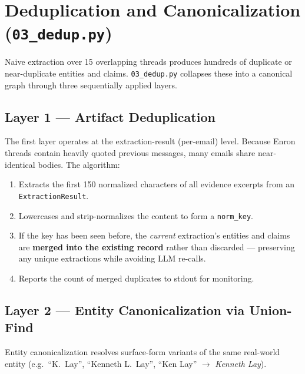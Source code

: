 \documentclass[12pt,a4paper]{article}
\begin{document}
\section{Deduplication and Canonicalization (\texttt{03\_dedup.py})}

Naive extraction over 15 overlapping threads produces hundreds of duplicate or near-duplicate entities and claims. \texttt{03\_dedup.py} collapses these into a canonical graph through three sequentially applied layers.

\subsection{Layer 1 — Artifact Deduplication}

The first layer operates at the extraction-result (per-email) level. Because Enron threads contain heavily quoted previous messages, many emails share near-identical bodies. The algorithm:

\begin{enumerate}
    \item Extracts the first 150 normalized characters of all evidence excerpts from an \texttt{ExtractionResult}.
    \item Lowercases and strip-normalizes the content to form a \texttt{norm\_key}.
    \item If the key has been seen before, the \textit{current} extraction's entities and claims are \textbf{merged into the existing record} rather than discarded — preserving any unique extractions while avoiding LLM re-calls.
    \item Reports the count of merged duplicates to stdout for monitoring.
\end{enumerate}

\subsection{Layer 2 — Entity Canonicalization via Union-Find}

Entity canonicalization resolves surface-form variants of the same real-world entity (e.g.\ ``K.\ Lay'', ``Kenneth L.\ Lay'', ``Ken Lay'' $\to$ \textit{Kenneth Lay}).
\end{document}

